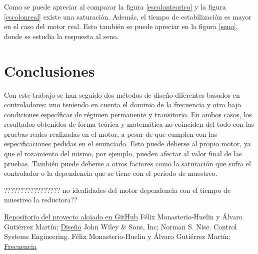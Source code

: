 \documentclass[a4paper]{article}
\begin{document}
Como se puede apreciar al comparar la figura \ref{escalonteorico} y la figura \ref{escalonreal} existe una saturación. Además, el tiempo de estabilización es mayor en el caso del motor real. Esto también se puede apreciar en la figura \ref{seno}, donde se estudia la respuesta al seno.

\section{Conclusiones}

Con este trabajo se han seguido dos métodos de diseño diferentes basados en controladores: uno teniendo en cuenta el dominio de la frecuencia y otro bajo condiciones específicas de régimen permanente y transitorio.
En ambos casos, los resultados obtenidos de forma teórica y matemática no coinciden del todo con las pruebas reales realizadas en el motor, a pesar de que cumplen con las especificaciones pedidas en el enunciado. Esto puede deberse al propio motor, ya que el rozamiento del mismo, por ejemplo, pueden afectar al valor final de las pruebas. También puede deberse a otros factores como la saturación que sufra el controlador o la dependencia que se tiene con el periodo de muestreo.
 
?????????????????
no idealidades del motor
dependencia con el tiempo de muestreo
la reductora??


\begin{thebibliography}{9}
 \href{https://github.com/avicarioe/telelabo}{Repositorio del proyecto alojado en GitHub}
 Félix Monasterio-Huelin y Álvaro Gutiérrez Martín;
\href{http://www.robolabo.etsit.upm.es/asignaturas/seco/apuntes/design.pdf}{Diseño}
 John Wiley \& Sons, Inc; Norman S. Nise. Control Systems Engineering.
 Félix Monasterio-Huelin y Álvaro Gutiérrez Martín;
\href{http://robolabo.etsit.upm.es/asignaturas/seco/apuntes/frecuencia.pdf} {Frecuencia}


\end{thebibliography}
\end{document}
